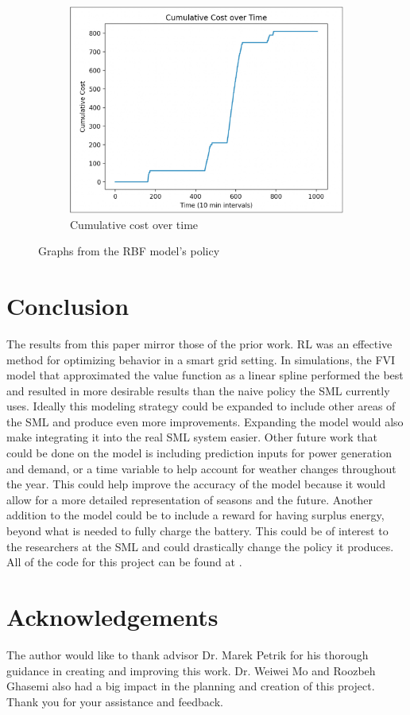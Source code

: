 \documentclass{article}
\begin{document}
\begin{figure}[H]
\begin{subfigure}[b]{0.3\linewidth}
    \includegraphics[width=\linewidth]{pics/rbfcostvtime.jpg}
    \caption{Cumulative cost over time}
  \end{subfigure}
  \caption{Graphs from the RBF model's policy}
  \label{fig:rbfgraphs}
\end{figure}


\section{Conclusion}
The results from this paper mirror those of the prior work. RL was an effective method for optimizing behavior in a smart grid setting. In simulations, the FVI model that approximated the value function as a linear spline performed the best and resulted in  more desirable results than the naive policy the SML currently uses. Ideally this modeling strategy could be expanded to include other areas of the SML and produce even more improvements. Expanding the model would also make integrating it into the real SML system easier. Other future work that could be done on the model is including prediction inputs for power generation and demand, or a time variable to help account for weather changes throughout the year. This could help improve the accuracy of the model because it would allow for a more detailed representation of seasons and the future. Another addition to the model could be to include a reward for having surplus energy, beyond what is needed to fully charge the battery. This could be of interest to the researchers at the SML and could drastically change the policy it produces. All of the code for this project can be found at \cite{github}.


\section{Acknowledgements}
The author would like to thank advisor Dr. Marek Petrik for his thorough guidance in creating and improving this work. Dr. Weiwei Mo and Roozbeh Ghasemi also had a big impact in the planning and creation of this project. Thank you for your assistance and feedback.





\end{document}
